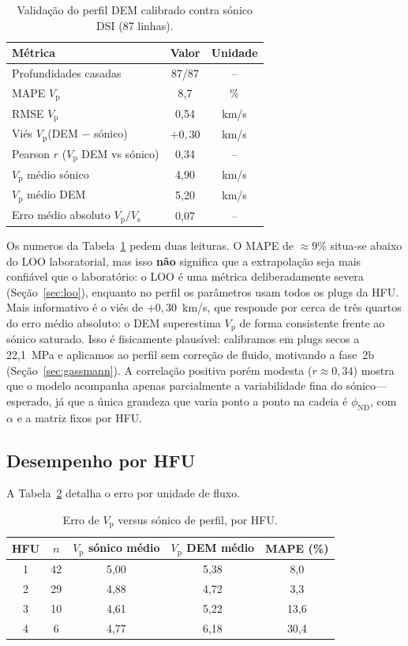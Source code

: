 \documentclass[11pt,a4paper]{article}
\numberwithin{equation}{section}
\newcommand{\phiND}{\ensuremath{\phi_{\mathrm{ND}}}}
\newcommand{\Vp}{\ensuremath{V_{\mathrm{p}}}}
\newcommand{\VpVs}{\ensuremath{V_{\mathrm{p}}/V_{\mathrm{s}}}}
\begin{document}
\begin{table}[H]
  \centering
  \caption{Validação do perfil DEM calibrado contra sónico DSI
           (87 linhas).}
  \label{tab:dlis_global}
  \begin{tabular}{lcc}
    \toprule
    Métrica & Valor & Unidade \\
    \midrule
    Profundidades casadas & 87/87 & -- \\
    MAPE \Vp & 8,7 & \% \\
    RMSE \Vp & 0,54 & km/s \\
    Viés \Vp (DEM $-$ sónico) & $+0{,}30$ & km/s \\
    Pearson $r$ (\Vp{} DEM vs sónico) & 0,34 & -- \\
    \Vp{} médio sónico & 4,90 & km/s \\
    \Vp{} médio DEM & 5,20 & km/s \\
    Erro médio absoluto \VpVs & 0,07 & -- \\
    \bottomrule
  \end{tabular}
\end{table}

Os numeros da Tabela~\ref{tab:dlis_global} pedem duas leituras.
O MAPE de $\approx 9\%$ situa-se abaixo do LOO laboratorial, mas isso
\textbf{não} significa que a extrapolação seja mais confiável que o
laboratório: o LOO é uma métrica deliberadamente severa (Seção~\ref{sec:loo}),
enquanto no perfil os parâmetros usam todos os plugs da HFU.
Mais informativo é o viés de $+0{,}30$~km/s, que responde por cerca de três
quartos do erro médio absoluto: o DEM superestima \Vp{} de forma consistente
frente ao sónico saturado.
Isso é fisicamente plausível: calibramos em plugs secos a 22,1~MPa e
aplicamos ao perfil sem correção de fluido, motivando a fase~2b
(Seção~\ref{sec:gassmann}).
A correlação positiva porém modesta ($r \approx 0{,}34$) mostra que o modelo
acompanha apenas parcialmente a variabilidade fina do sónico---esperado,
já que a única grandeza que varia ponto a ponto na cadeia é \phiND{}, com
$\alpha$ e a matriz fixos por HFU.

\subsection{Desempenho por HFU}

A Tabela~\ref{tab:dlis_hfu} detalha o erro por unidade de fluxo.

\begin{table}[H]
  \centering
  \caption{Erro de \Vp{} versus sónico de perfil, por HFU.}
  \label{tab:dlis_hfu}
  \begin{tabular}{ccccc}
    \toprule
    HFU & $n$ & \Vp{} sónico médio & \Vp{} DEM médio & MAPE (\%) \\
    \midrule
    1 & 42 & 5,00 & 5,38 & 8,0 \\
    2 & 29 & 4,88 & 4,72 & 3,3 \\
    3 & 10 & 4,61 & 5,22 & 13,6 \\
    4 & 6  & 4,77 & 6,18 & 30,4 \\
    \bottomrule
  \end{tabular}
\end{table}
\end{document}
